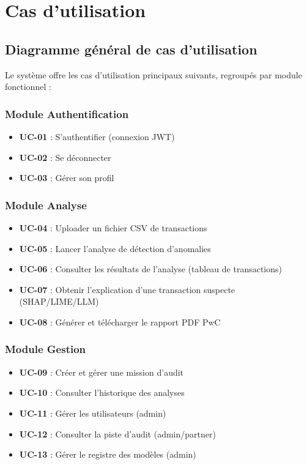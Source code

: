 \documentclass[12pt,a4paper,twoside]{report}
\theoremstyle{definition}
\begin{document}
\section{Cas d'utilisation}

\subsection{Diagramme général de cas d'utilisation}


Le système offre les cas d'utilisation principaux suivants, regroupés par module
fonctionnel :

\subsubsection{Module Authentification}
\begin{itemize}
  \item \textbf{UC-01} : S'authentifier (connexion JWT)
  \item \textbf{UC-02} : Se déconnecter
  \item \textbf{UC-03} : Gérer son profil
\end{itemize}

\subsubsection{Module Analyse}
\begin{itemize}
  \item \textbf{UC-04} : Uploader un fichier CSV de transactions
  \item \textbf{UC-05} : Lancer l'analyse de détection d'anomalies
  \item \textbf{UC-06} : Consulter les résultats de l'analyse (tableau de transactions)
  \item \textbf{UC-07} : Obtenir l'explication d'une transaction suspecte (SHAP/LIME/LLM)
  \item \textbf{UC-08} : Générer et télécharger le rapport PDF PwC
\end{itemize}

\subsubsection{Module Gestion}
\begin{itemize}
  \item \textbf{UC-09} : Créer et gérer une mission d'audit
  \item \textbf{UC-10} : Consulter l'historique des analyses
  \item \textbf{UC-11} : Gérer les utilisateurs (admin)
  \item \textbf{UC-12} : Consulter la piste d'audit (admin/partner)
  \item \textbf{UC-13} : Gérer le registre des modèles (admin)
\end{itemize}
\end{document}
